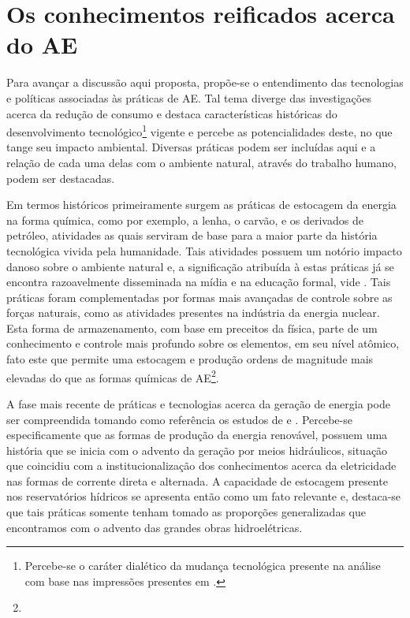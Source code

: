 \documentclass[
  12pt,       %
  openright,      %
  twoside,      %
  a4paper,      %
  english,      %
  french,       %
  spanish,      %
  brazil        %
  ]{abntex2}
\begin{document}
\section{Os conhecimentos reificados acerca do AE}

Para avançar a discussão aqui proposta, propõe-se o entendimento das tecnologias e políticas associadas às práticas de AE. Tal tema diverge das investigações acerca da redução de consumo e destaca características históricas do desenvolvimento tecnológico\footnote{Percebe-se o caráter dialético da mudança tecnológica presente na análise com base nas impressões presentes em .} vigente e percebe as potencialidades deste, no que tange seu impacto ambiental. Diversas práticas podem ser incluídas aqui e a relação de cada uma delas com o ambiente natural, através do trabalho humano, podem ser destacadas.

Em termos históricos primeiramente surgem as práticas de estocagem da energia na forma química, como por exemplo, a lenha, o carvão, e os derivados de petróleo, atividades as quais serviram de base para a maior parte da história tecnológica vivida pela humanidade. Tais atividades possuem um notório impacto danoso sobre o ambiente natural e, a significação atribuída à estas práticas já se encontra razoavelmente disseminada na mídia e na educação formal, vide . Tais práticas foram complementadas por formas mais avançadas de controle sobre as forças naturais, como as atividades presentes na indústria da energia nuclear. Esta forma de armazenamento, com base em preceitos da física, parte de um conhecimento e controle mais profundo sobre os elementos, em seu nível atômico, fato este que permite uma estocagem e produção ordens de magnitude mais elevadas do que as formas químicas de AE\footnote{}.

A fase mais recente de práticas e tecnologias acerca da geração de energia pode ser compreendida tomando como referência os estudos de  e . Percebe-se especificamente que as formas de produção da energia renovável, possuem uma história que se inicia com o advento da geração por meios hidráulicos, situação que coincidiu com a institucionalização dos conhecimentos acerca da eletricidade nas formas de corrente direta e alternada. A capacidade de estocagem presente nos reservatórios hídricos se apresenta então como um fato relevante e, destaca-se que tais práticas somente tenham tomado as proporções generalizadas que encontramos com o advento das grandes obras hidroelétricas. 
\end{document}
